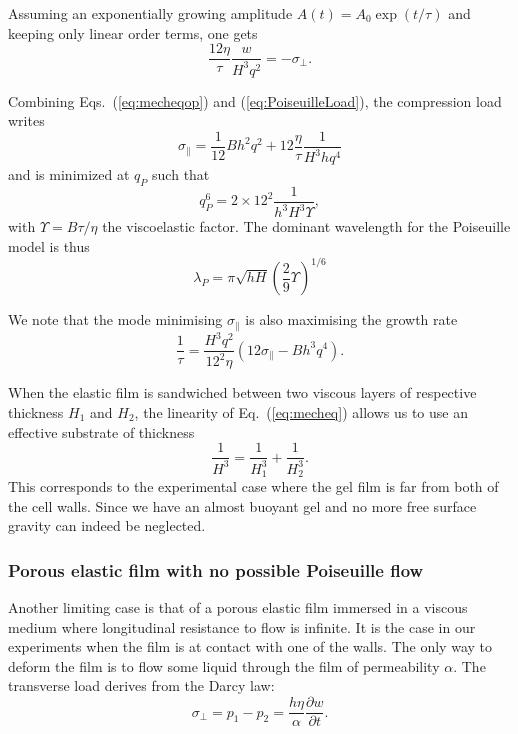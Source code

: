 \documentclass[twocolumn,superscriptaddress,showpacs,preprintnumbers,
amsmath,amssymb,prl]{revtex4-1}
\begin{document}
Assuming an exponentially growing amplitude $A(t) = A_0 \exp(t/\tau)$ and keeping only linear order terms, one gets
\begin{equation}
\frac{12\eta}{\tau} \frac{w}{H^3q^2} = -\sigma_\perp.
\label{eq:PoiseuilleLoad}
\end{equation}

Combining Eqs.~(\ref{eq:mecheqop}) and (\ref{eq:PoiseuilleLoad}), the compression load writes
\begin{equation}
\sigma_\parallel = \frac{1}{12}B h^2 q^2 + 12\frac{\eta}{\tau}\frac{1}{H^3 h q^4}
\label{eq:sigma0P}
\end{equation}
and is minimized at $q_P$ such that
\begin{equation}
q_P^6 = 2\times 12^2 \frac{1}{h^3H^3\Upsilon},
\label{eq:qP}
\end{equation}
with $\Upsilon = B\tau/\eta$ the viscoelastic factor. The dominant wavelength for the Poiseuille model is thus
\begin{equation}
\lambda_P = \pi\sqrt{hH}\left(\frac{2}{9}\Upsilon\right)^{1/6}
\end{equation}

We note that the mode minimising $\sigma_\parallel$ is also maximising the growth rate
\begin{equation}
\frac{1}{\tau} = \frac{H^3q^2}{12^2\eta}\left(12\sigma_\parallel - Bh^3q^4\right).
\end{equation}

When the elastic film is sandwiched between two viscous layers of respective thickness $H_1$ and $H_2$, the linearity of Eq.~(\ref{eq:mecheq}) allows us to use an effective substrate of thickness 
\begin{equation}
\frac{1}{H^3} = \frac{1}{H_1^3}+\frac{1}{H_2^3}.
\end{equation}
This corresponds to the experimental case where the gel film is far from both of the cell walls. Since we have an almost buoyant gel and no more free surface gravity can indeed be neglected.

\subsubsection*{Porous elastic film with no possible Poiseuille flow}
Another limiting case is that of a porous elastic film immersed in a viscous medium where longitudinal resistance to flow is infinite. It is the case in our experiments when the film is at contact with one of the walls. The only way to deform the film is to flow some liquid through the film of permeability $\alpha$. The transverse load derives from the Darcy law:
\begin{equation}
\sigma_\perp = p_1-p_2 = \frac{h\eta}{\alpha}\frac{\partial w}{\partial t}.
\label{eq:DarcyLoad}
\end{equation}
\end{document}
